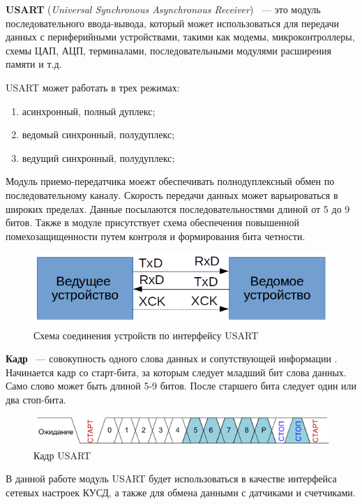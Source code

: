\textbf{USART} (\textit{Universal Synchronous Asynchronous Receiver}) ~--- это модуль последовательного ввода-вывода, который может использоваться для передачи данных с периферийными устройствами, такими как модемы, микроконтроллеры, схемы ЦАП, АЦП, терминалами, последовательными модулями расширения памяти и т.д. \cite{usart1}

USART может работать в трех режимах:
\begin{enumerate}
\item асинхронный, полный дуплекс;
\item ведомый синхронный, полудуплекс;
\item ведущий синхронный, полудуплекс;
\end{enumerate}

Модуль приемо-передатчика моежт обеспечивать полнодуплексный обмен по последовательному каналу. Скорость передачи данных может варьироваться в широких пределах. Данные посылаются последовательностями длиной от 5 до 9 битов. Также в модуле присутствует схема обеспечения повышенной помехозащищенности путем контроля и формирования бита четности.

\begin{figure}[H]
	\label{usartscheme}
	\centering
		\includegraphics[scale=0.8]{img/usartscheme.png}
	\caption{Схема соединения устройств по интерфейсу USART}
\end{figure}

\textbf{Кадр} ~--- совокупность одного слова данных и сопутствующей информации \cite{usart1}. Начинается кадр со старт-бита, за которым следует младший бит слова данных. Само слово может быть длиной 5-9 битов. После 
старшего бита следует один или два стоп-бита.

\begin{figure}[H]
	\label{usartframe}
	\centering
		\includegraphics[scale=0.8]{img/usartframe.png}
	\caption{Кадр USART\cite{usart1}}
\end{figure}

В данной работе модуль USART будет использоваться в качестве интерфейса сетевых настроек КУСД, а также для обмена данными с датчиками и счетчиками.

